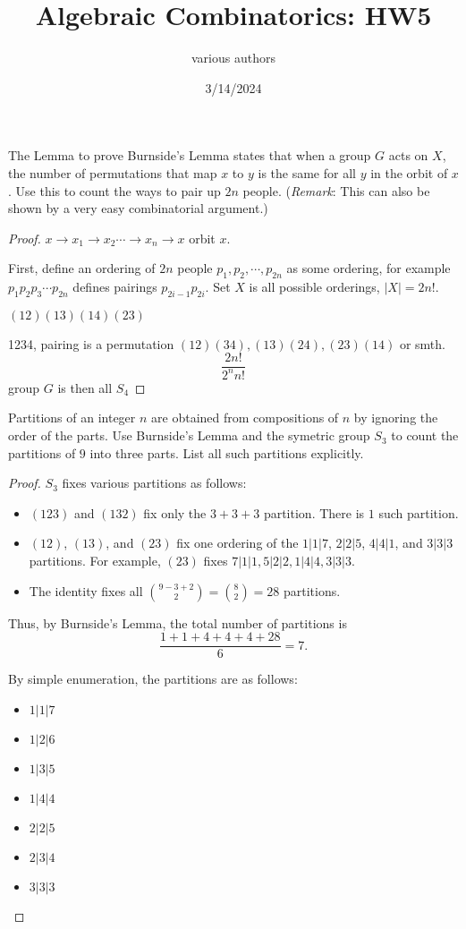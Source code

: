 \documentclass[11pt]{article}
\title{Algebraic Combinatorics: HW5}
\author{various authors}
\date{3/14/2024}
\begin{document}
\maketitle
\begin{quest}[\textcolor{red}{Pairing $2n$ people}]
    The Lemma to prove Burnside’s Lemma states that when a group $G$ acts on $X$, the number of permutations that map $x$ to $y$ is the same for all $y$ in the orbit of $x$. Use this to count the ways to pair up $2n$ people. (\textit{Remark}: This can also be shown by a very easy combinatorial argument.)
\end{quest}
\begin{proof}
    $x\to x_1\to x_2\cdots\to x_n\to x$ orbit $x$.

    First, define an ordering of $2n$ people $p_1,p_2,\cdots,p_{2n}$ as some ordering, for example $p_1p_2p_3\cdots p_{2n}$ defines pairings $p_{2i-1}p_{2i}$. Set $X$ is all possible orderings, $|X|=2n!$.

    $(12)(13)(14)(23)$

    1234, pairing is a permutation $(12)(34),(13)(24),(23)(14)$ or smth.
\[\frac{2n!}{2^n n!}\]
    group $G$ is then all $S_4$
\end{proof}
\begin{quest}
    Partitions of an integer $n$ are obtained from compositions of $n$ by ignoring the order of the parts. Use Burnside's Lemma and the symetric group $S_3$ to count the partitions of $9$ into three parts. List all such partitions explicitly.
\end{quest}
\begin{proof}
    $S_3$ fixes various partitions as follows:
    \begin{itemize}
        \item $(123)$ and $(132)$ fix only the $3+3+3$ partition. There is $1$ such partition.
        \item $(12)$, $(13)$, and $(23)$ fix one ordering of the $1|1|7$, $2|2|5$, $4|4|1$, and $3|3|3$ partitions. For example, $(23)$ fixes $7|1|1,5|2|2,1|4|4,3|3|3$.
        \item The identity fixes all $\binom{9-3+2}{2}=\binom{8}{2}=28$ partitions.
    \end{itemize}
    Thus, by Burnside's Lemma, the total number of partitions is
    \[\frac{1+1+4+4+4+28}{6}=7.\]

    By simple enumeration, the partitions are as follows:
    \begin{itemize}
        \item $1|1|7$
        \item $1|2|6$
        \item $1|3|5$
        \item $1|4|4$
        \item $2|2|5$
        \item $2|3|4$
        \item $3|3|3$
    \end{itemize}
\end{proof}
\end{document}
